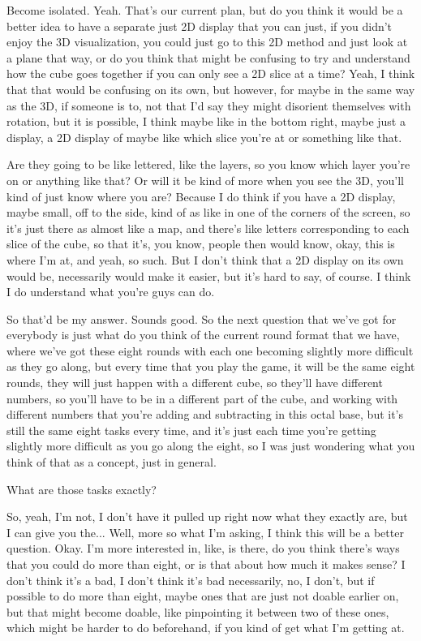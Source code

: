 \documentclass{article}
\begin{document}
Become isolated. Yeah. That's our current plan, but do you think it would be a better idea to have
a separate just 2D display that you can just, if you didn't enjoy the 3D visualization, you could just
go to this 2D method and just look at a plane that way, or do you think that might be confusing to
try and understand how the cube goes together if you can only see a 2D slice at a time? Yeah, I
think that that would be confusing on its own, but however, for maybe in the same way as the 3D,
if someone is to, not that I'd say they might disorient themselves with rotation, but it is possible, I
think maybe like in the bottom right, maybe just a display, a 2D display of maybe like which slice
you're at or something like that.

Are they going to be like lettered, like the layers, so you know which layer you're on or anything
like that? Or will it be kind of more when you see the 3D, you'll kind of just know where you are?
Because I do think if you have a 2D display, maybe small, off to the side, kind of as like in one of
the corners of the screen, so it's just there as almost like a map, and there's like letters
corresponding to each slice of the cube, so that it's, you know, people then would know, okay,
this is where I'm at, and yeah, so such. But I don't think that a 2D display on its own would be,
necessarily would make it easier, but it's hard to say, of course. I think I do understand what
you're guys can do.

So that'd be my answer. Sounds good. So the next question that we've got for everybody is just
what do you think of the current round format that we have, where we've got these eight rounds
with each one becoming slightly more difficult as they go along, but every time that you play the
game, it will be the same eight rounds, they will just happen with a different cube, so they'll have
different numbers, so you'll have to be in a different part of the cube, and working with different
numbers that you're adding and subtracting in this octal base, but it's still the same eight tasks
every time, and it's just each time you're getting slightly more difficult as you go along the eight,
so I was just wondering what you think of that as a concept, just in general.

What are those tasks exactly? 

So, yeah, I'm not, I don't have it pulled up right now what they
exactly are, but I can give you the... Well, more so what I'm asking, I think this will be a better
question. Okay. I'm more interested in, like, is there, do you think there's ways that you could do
more than eight, or is that about how much it makes sense? I don't think it's a bad, I don't think it's
bad necessarily, no, I don't, but if possible to do more than eight, maybe ones that are just not
doable earlier on, but that might become doable, like pinpointing it between two of these ones,
which might be harder to do beforehand, if you kind of get what I'm getting at.
\end{document}
